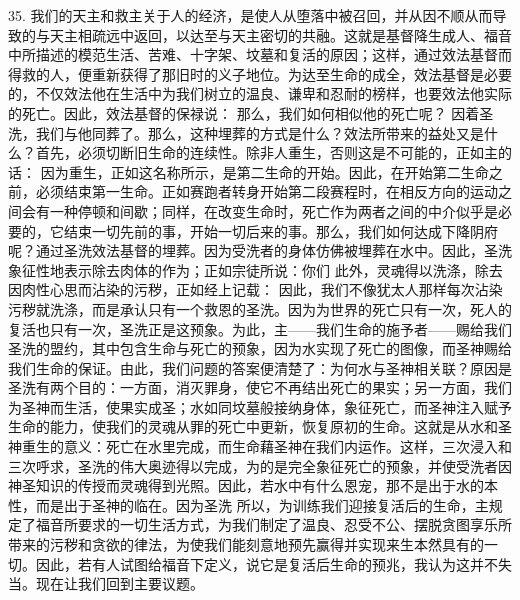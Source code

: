 35. 我们的天主和救主关于人的经济，是使人从堕落中被召回，并从因不顺从而导致的与天主相疏远中返回，以达至与天主密切的共融。这就是基督降生成人、福音中所描述的模范生活、苦难、十字架、坟墓和复活的原因；这样，通过效法基督而得救的人，便重新获得了那旧时的义子地位。为达至生命的成全，效法基督是必要的，不仅效法他在生活中为我们树立的温良、谦卑和忍耐的榜样，也要效法他实际的死亡。因此，效法基督的保禄说： 那么，我们如何相似他的死亡呢？ 因着圣洗，我们与他同葬了。那么，这种埋葬的方式是什么？效法所带来的益处又是什么？首先，必须切断旧生命的连续性。除非人重生，否则这是不可能的，正如主的话： 因为重生，正如这名称所示，是第二生命的开始。因此，在开始第二生命之前，必须结束第一生命。正如赛跑者转身开始第二段赛程时，在相反方向的运动之间会有一种停顿和间歇；同样，在改变生命时，死亡作为两者之间的中介似乎是必要的，它结束一切先前的事，开始一切后来的事。那么，我们如何达成下降阴府呢？通过圣洗效法基督的埋葬。因为受洗者的身体仿佛被埋葬在水中。因此，圣洗象征性地表示除去肉体的作为；正如宗徒所说：你们 此外，灵魂得以洗涤，除去因肉性心思而沾染的污秽，正如经上记载： 因此，我们不像犹太人那样每次沾染污秽就洗涤，而是承认只有一个救恩的圣洗。因为为世界的死亡只有一次，死人的复活也只有一次，圣洗正是这预象。为此，主——我们生命的施予者——赐给我们圣洗的盟约，其中包含生命与死亡的预象，因为水实现了死亡的图像，而圣神赐给我们生命的保证。由此，我们问题的答案便清楚了：为何水与圣神相关联？原因是圣洗有两个目的：一方面，消灭罪身，使它不再结出死亡的果实；另一方面，我们为圣神而生活，使果实成圣；水如同坟墓般接纳身体，象征死亡，而圣神注入赋予生命的能力，使我们的灵魂从罪的死亡中更新，恢复原初的生命。这就是从水和圣神重生的意义：死亡在水里完成，而生命藉圣神在我们内运作。这样，三次浸入和三次呼求，圣洗的伟大奥迹得以完成，为的是完全象征死亡的预象，并使受洗者因神圣知识的传授而灵魂得到光照。因此，若水中有什么恩宠，那不是出于水的本性，而是出于圣神的临在。因为圣洗 所以，为训练我们迎接复活后的生命，主规定了福音所要求的一切生活方式，为我们制定了温良、忍受不公、摆脱贪图享乐所带来的污秽和贪欲的律法，为使我们能刻意地预先赢得并实现来生本然具有的一切。因此，若有人试图给福音下定义，说它是复活后生命的预兆，我认为这并不失当。现在让我们回到主要议题。\par

